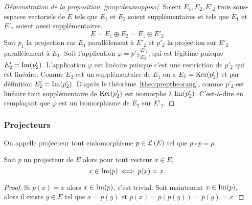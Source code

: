 \begin{proof}[Démonstration de la proposition~\ref{prop:deuxsuppiso}]
  Soient \(E_1, E_2, E'_2\) trois sous-espaces vectoriels de \(E\) tels que 
  \(E_1\) et \(E_2\) soient supplémentaires et tels que \(E_1\) et \(E'_2\) 
  soient aussi supplémentaires.
  \begin{equation}
    E=E_1 \oplus E_2 = E_1 \oplus E'_2
  \end{equation}
  Soit \(p_1\) la projection sur \(E_1\) parallèlement à \(E'_2\) et \(p'_2\) la 
  projection sur \(E'_2\) parallélement à \(E_1\). Soit l'application 
  \(\varphi={p'_2}_{|E_2}^{|E'_2}\), qui est légitime puisque 
  \(E'_2=\operatorname{Im}(p'_2)\). L'application \(\varphi\) est linéaire puisque c'est 
  une restriction de \(p'_2\) qui est linéaire. Comme \(E_2\) est un 
  supplémentaire de \(E_1\) on a \(E_1 = \operatorname{Ker}(p'_2)\) et par définition \(E'_2 = 
  \operatorname{Im}(p'_2)\). D'après le théorème~\ref{theo:preptheorang}, comme \(p'_2\) est linéaire tout supplémentaire de 
  \(\operatorname{Ker}(p'_2)\) est isomorphe à \(\operatorname{Im}(p'_2)\). C'est-à-dire en remplaçant 
  que \(\varphi\) est un isomorphisme de \(E_2\) sur \(E'_2\).
\end{proof}

\subsubsection{Projecteurs}

\begin{defdef}
  On appelle projecteur tout endomorphisme \(p \in \mathcal{L}\left(E\right)\) tel que \(p \circ 
  p=p\).
\end{defdef}

\begin{prop}\label{prop:caracimageproj}
  Soit \(p\) un projecteur de \(E\) alors pour tout vecteur \(x \in E\),
  \begin{equation}
    x \in \operatorname{Im}(p) \iff p(x)=x.
  \end{equation}
\end{prop}
\begin{proof}
  Si \(p(x)=x\) alors \(x \in \operatorname{Im}(p)\), c'est trivial. Soit maintenant \(x 
  \in \operatorname{Im}(p)\), alors il existe \(y \in E\) tel que \(x=p(y)\) et 
  \(p(x)=p(p(y))=p(y)=x\).
\end{proof}

